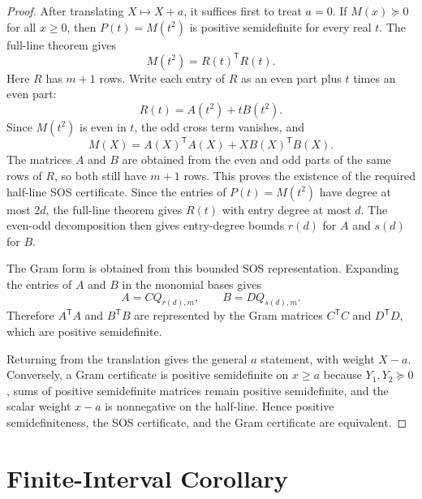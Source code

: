 \documentclass[uplatex,dvipdfmx]{jsarticle}
\newcommand{\psd}{\succeq 0}
\newcommand{\restateprefix}{}
\theoremstyle{matrixsosdefinition}
\begin{document}
\begin{proof}
After translating \(X\mapsto X+a\), it suffices first to treat \(a=0\).  If
\(M(x)\psd\) for all \(x\ge0\), then \(P(t)=M(t^2)\) is positive semidefinite
for every real \(t\). The full-line theorem gives
\[
  M(t^2)=R(t)^{\mathsf T}R(t).
\]
Here \(R\) has \(m+1\) rows.
Write each entry of \(R\) as an even part plus \(t\) times an even part:
\[
  R(t)=A(t^2)+tB(t^2).
\]
Since \(M(t^2)\) is even in \(t\), the odd cross term vanishes, and
\[
  M(X)=A(X)^{\mathsf T}A(X)+X B(X)^{\mathsf T}B(X).
\]
The matrices \(A\) and \(B\) are obtained from the even and odd parts of the
same rows of \(R\), so both still have \(m+1\) rows.  This proves the existence
of the required half-line SOS certificate.  Since the entries of \(P(t)=M(t^2)\) have degree at
most \(2d\), the full-line theorem gives \(R(t)\) with entry degree at most
\(d\).  The even-odd decomposition then gives entry-degree bounds \(r(d)\) for
\(A\) and \(s(d)\) for \(B\).

The Gram form is obtained from this bounded SOS representation.  Expanding the
entries of \(A\) and \(B\) in the monomial bases gives
\[
  A=CQ_{r(d),m},\qquad B=DQ_{s(d),m}.
\]
Therefore \(A^{\mathsf T}A\) and \(B^{\mathsf T}B\) are represented by the
Gram matrices \(C^{\mathsf T}C\) and \(D^{\mathsf T}D\), which are positive
semidefinite.

Returning from the translation gives the general \(a\) statement, with weight
\(X-a\).  Conversely, a Gram certificate is positive semidefinite on \(x\ge a\)
because \(Y_1,Y_2\psd\), sums of positive semidefinite matrices remain positive
semidefinite, and the scalar weight \(x-a\) is nonnegative on the half-line.
Hence positive semidefiniteness, the SOS certificate, and the Gram certificate
are equivalent.
\end{proof}

\section{Finite-Interval Corollary}

{\renewcommand{\restateprefix}{Restated; }\finiteIntervalMarkovLukacs*}
\end{document}
